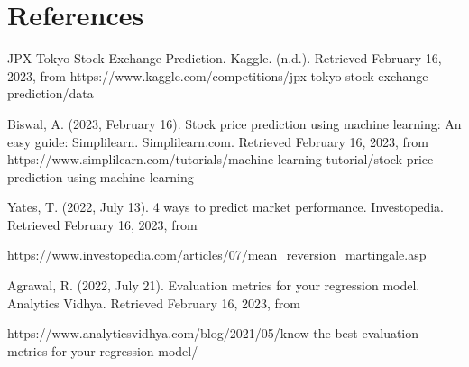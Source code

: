 \documentclass{article}
\begin{document}
\section{References}

\cite{hegazy2014machine}

\cite{CHONG2017187}

\cite{JIANG2021115537}

\cite{8541310}

\cite{arXiv:1605.00003}

\cite{JPX} 
JPX Tokyo Stock Exchange Prediction. Kaggle. (n.d.). Retrieved February 16, 2023, from https://www.kaggle.com/competitions/jpx-tokyo-stock-exchange-prediction/data 

\cite{Biswal} 
Biswal, A. (2023, February 16). Stock price prediction using machine learning: An easy guide: Simplilearn. Simplilearn.com. Retrieved February 16, 2023, from https://www.simplilearn.com/tutorials/machine-learning-tutorial/stock-price-prediction-using-machine-learning 

\cite{Yates} 
Yates, T. (2022, July 13). 4 ways to predict market performance. Investopedia. Retrieved February 16, 2023, from 

https://www.investopedia.com/articles/07/mean_reversion_martingale.asp 

\cite{Agrawal} 
Agrawal, R. (2022, July 21). Evaluation metrics for your regression model. Analytics Vidhya. Retrieved February 16, 2023, from 

https://www.analyticsvidhya.com/blog/2021/05/know-the-best-evaluation-metrics-for-your-regression-model/ 
\end{document}
